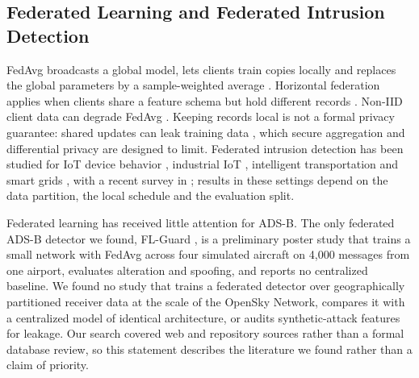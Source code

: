 \documentclass[conference]{IEEEtran}
\begin{document}
\subsection{Federated Learning and Federated Intrusion Detection}
FedAvg broadcasts a global model, lets clients train copies locally and replaces the global parameters by a sample-weighted average \cite{mcmahan2017}. Horizontal federation applies when clients share a feature schema but hold different records \cite{yang2019}. Non-IID client data can degrade FedAvg \cite{zhao2018,li2020fedprox}. Keeping records local is not a formal privacy guarantee: shared updates can leak training data \cite{zhu2019}, which secure aggregation \cite{bonawitz2017} and differential privacy \cite{abadi2016} are designed to limit. Federated intrusion detection has been studied for IoT device behavior \cite{nguyen2019diot}, industrial IoT \cite{ruzafa2023}, intelligent transportation \cite{abdelbasset2022} and smart grids \cite{kesici2024}, with a recent survey in \cite{khraisat2024}; results in these settings depend on the data partition, the local schedule and the evaluation split.

Federated learning has received little attention for ADS-B. The only federated ADS-B detector we found, FL-Guard \cite{khan2022flguard}, is a preliminary poster study that trains a small network with FedAvg across four simulated aircraft on 4,000 messages from one airport, evaluates alteration and spoofing, and reports no centralized baseline. We found no study that trains a federated detector over geographically partitioned receiver data at the scale of the OpenSky Network, compares it with a centralized model of identical architecture, or audits synthetic-attack features for leakage. Our search covered web and repository sources rather than a formal database review, so this statement describes the literature we found rather than a claim of priority.
\end{document}
